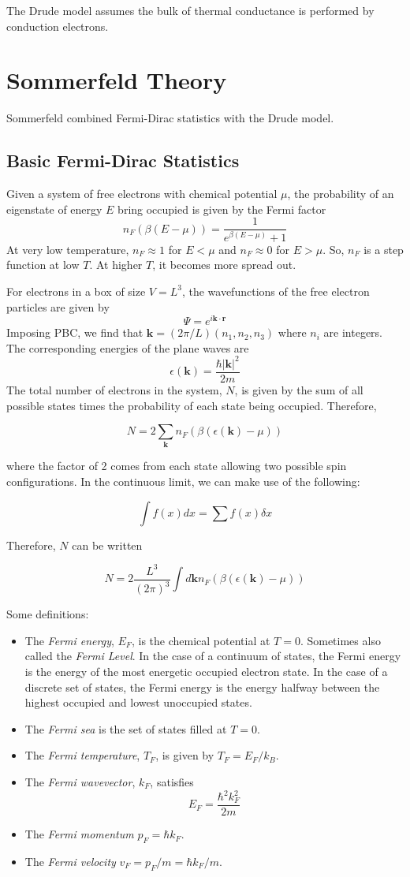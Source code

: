 \documentclass[10pt]{article}
\begin{document}
The Drude model assumes the bulk of thermal conductance is performed by conduction electrons.

\section{Sommerfeld Theory}
Sommerfeld combined Fermi-Dirac statistics with the Drude model.
\subsection{Basic Fermi-Dirac Statistics}
Given a system of free electrons with chemical potential $\mu$, the probability of an eigenstate of energy $E$ bring occupied is given by the
Fermi factor
$$n_{F}(\beta(E-\mu)) = \frac{1}{e^{\beta(E - \mu)}+1}$$
At very low temperature, $n_{F} \approx 1$ for $E < \mu$ and $n_{F} \approx 0$ for $E > \mu$. So, $n_{F}$ is a step function
at low $T$. At higher $T$, it becomes more spread out.

For electrons in a box of size $V = L^{3}$, the wavefunctions of the free electron particles are given by
$$\Psi = e^{i\textbf{k}\cdot\textbf{r}}$$
Imposing PBC, we find that $\textbf{k} = (2\pi/L)(n_{1},n_{2},n_{3})$ where $n_{i}$ are integers. The corresponding
energies of the plane waves are
$$\epsilon(\textbf{k}) = \frac{\hbar |\textbf{k}|^{2}}{2m}$$
The total number of electrons in the system, $N$, is given by the sum of all possible states times the probability of each state being occupied.
Therefore,

$$N = 2 \sum_{\textbf{k}}n_{F}(\beta(\epsilon(\textbf{k}) - \mu))$$

where the factor of 2 comes from each state allowing two possible spin configurations. In the continuous limit, we can make
use of the following:

$$\int f(x)dx = \sum f(x)\delta x$$

Therefore, $N$ can be written

$$
N = 2 \frac{L^{3}}{(2\pi)^{3}}\int d\textbf{k} n_{F}(\beta(\epsilon(\textbf{k}) - \mu))
$$

Some definitions:
\begin{itemize}
  \item The \emph{Fermi energy}, $E_{F}$, is the chemical potential at $T = 0$. Sometimes also called the \emph{Fermi Level}.
  In the case of a continuum of states, the Fermi energy is the energy of the most energetic occupied electron state. In the case of a discrete
  set of states, the Fermi energy is the energy halfway between the highest occupied and lowest unoccupied states.
  \item The \emph{Fermi sea} is the set of states filled at $T = 0$.
  \item The \emph{Fermi temperature}, $T_{F}$, is given by $T_{F} = E_{F}/k_{B}$.
  \item The \emph{Fermi wavevector}, $k_{F}$, satisfies
  $$E_{F} = \frac{\hbar^{2}k_{F}^{2}}{2m}$$
  \item The \emph{Fermi momentum} $p_{F} = \hbar k_{F}$.
  \item The \emph{Fermi velocity} $v_{F} = p_{F}/m = \hbar k_{F}/m$.
\end{itemize}
\end{document}
